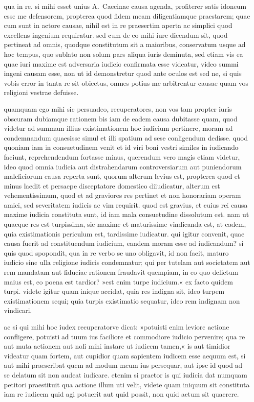  qua in re, si mihi esset unius A.~Caecinae causa agenda, profiterer satis idoneum esse me defensorem, propterea quod fidem meam diligentiamque praestarem; quae cum sunt in actore causae, nihil est in re praesertim aperta ac simplici quod excellens ingenium requiratur. sed cum de eo mihi iure dicendum sit, quod pertineat ad omnis, quodque constitutum sit a maioribus, conservatum usque ad hoc tempus, quo sublato non solum pars aliqua iuris deminuta, sed etiam vis ea quae iuri maxime est adversaria iudicio confirmata esse videatur, video summi ingeni causam esse, non ut id demonstretur quod ante oculos est sed ne, si quis vobis error in tanta re sit obiectus, omnes potius me arbitrentur causae quam vos religioni vestrae defuisse.

 quamquam ego mihi sic persuadeo, recuperatores, non vos tam propter iuris obscuram dubiamque rationem bis iam de eadem causa dubitasse quam, quod videtur ad summam illius existimationem hoc iudicium pertinere, moram ad condemnandum quaesisse simul et illi spatium ad sese conligendum dedisse. quod quoniam iam in consuetudinem venit et id viri boni vestri similes in iudicando faciunt, reprehendendum fortasse minus, querendum vero magis etiam videtur, ideo quod omnia iudicia aut distrahendarum controversiarum aut puniendorum maleficiorum causa reperta sunt, quorum alterum levius est, propterea quod et minus laedit et persaepe disceptatore domestico diiudicatur, alterum est vehementissimum, quod et ad graviores res pertinet et non honorariam operam amici, sed severitatem iudicis ac vim requirit.  quod est gravius, et cuius rei causa maxime iudicia constituta sunt, id iam mala consuetudine dissolutum est. nam ut quaeque res est turpissima, sic maxime et maturissime vindicanda est, at eadem, quia existimationis periculum est, tardissime iudicatur. qui igitur convenit, quae causa fuerit ad constituendum iudicium, eandem moram esse ad iudicandum? si quis quod spopondit, qua in re verbo se uno obligavit, id non facit, maturo iudicio sine ulla religione iudicis condemnatur; qui per tutelam aut societatem aut rem mandatam aut fiduciae rationem fraudavit quempiam, in eo quo delictum maius est, eo poena est tardior?  »est enim turpe iudicium.« ex facto quidem turpi. videte igitur quam inique accidat, quia res indigna sit, ideo turpem existimationem sequi; quia turpis existimatio sequatur, ideo rem indignam non vindicari.

ac si qui mihi hoc iudex recuperatorve dicat: »potuisti enim leviore actione confligere, potuisti ad tuum ius faciliore et commodiore iudicio pervenire; qua re aut muta actionem aut noli mihi instare ut iudicem tamen,« is aut timidior videatur quam fortem, aut cupidior quam sapientem iudicem esse aequum est, si aut mihi praescribat quem ad modum meum ius persequar, aut ipse id quod ad se delatum sit non audeat iudicare. etenim si praetor is qui iudicia dat numquam petitori praestituit qua actione illum uti velit, videte quam iniquum sit constituta iam re iudicem quid agi potuerit aut quid possit, non quid actum sit quaerere.

